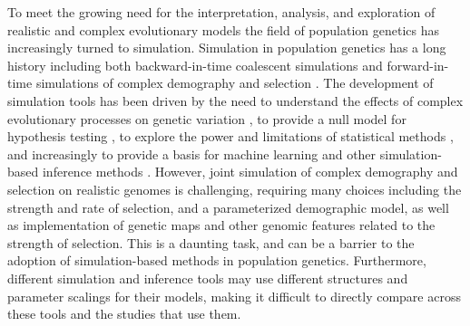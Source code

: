 \documentclass[hidelinks]{article}
\begin{document}
    To meet the growing need for the interpretation,
    analysis, and exploration of realistic and complex evolutionary models
    the field of population genetics has increasingly turned to simulation.
    Simulation in population genetics has a long history 
    including both backward-in-time coalescent simulations
    \citep{kingman1982genealogy,hudson1983testing, hudson1990gene}
    and forward-in-time simulations of complex demography and selection
    \citep[e.g.,][]{gillespie1984molecular, hernandez2008flexible, thornton2014c++, haller2019slim}. 
    The development of simulation tools has been driven by the need to
    understand the effects of complex evolutionary processes on genetic
    variation \citep[e.g.,][]{peischl2013accumulation, thornton2019polygenic, galloway2020few, zhang2020impact}, 
     to provide a null model for hypothesis testing
    \citep[e.g.,][]{hudson1992statistical,hudson1994evidence,sabeti2002detecting},
    to explore the power and limitations of statistical methods \citep[e.g.,][]{przeworski2002signature},
    and increasingly to provide a basis for machine learning and other
    simulation-based inference methods 
    \citep[e.g.,][]{beaumont2002approximate,lin2011distinguishing,kern2018diplos,mughal2019localizing,sanchez2021deep,wang2021automatic, zhang2023maladapt, smith2023dispersenn2}.
    However, joint simulation of complex demography and selection on realistic genomes is challenging,
    requiring many choices including the strength and rate of selection,
    and a parameterized demographic model,
    as well as implementation of genetic maps and other genomic features related to the strength of selection.
    This is a daunting task, and can be a barrier to
    the adoption of simulation-based methods in population genetics.
    Furthermore, different simulation and inference tools may use different structures
    and parameter scalings for their models,
    making it difficult to directly compare across these tools and the studies that use them.
\end{document}

